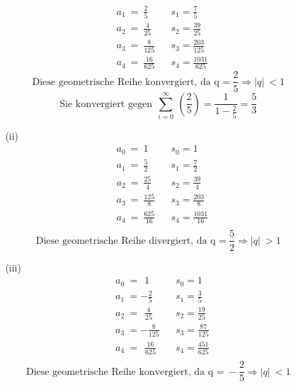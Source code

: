 \documentclass [a4paper,12pt]{article}
\begin{document}
\begin{enumerate}
\begin{enumerate}
\begin{enumerate}
\begin{align*}
                                &a_1 \ = \ \frac{2}{5} 		&&	s_1 = \frac{7}{5}\\[0,15cm]
                                &a_2 \ = \ \frac{4}{25} 	&&	s_2 = \frac{39}{25}\\[0,15cm]
                                &a_3 \ = \ \frac{8}{125} 	&&	s_3 = \frac{203}{125}\\[0,15cm]
                                &a_4 \ = \ \frac{16}{625}	&&	s_4 = \frac{1031}{625} 
                            \end{align*}
				            $$\text{Diese geometrische Reihe konvergiert, da q =} \ \frac{2}{5} \Rightarrow |q| \ < 1$$
				            \[\text{Sie konvergiert gegen} \ \  \sum_{i=0}^\infty~\left(\frac{2}{5}\right) = \frac{1}{1-\frac{2}{5}} = \frac{5}{3} \]
                        \item[(ii)]
                            \begin{align*}
                				&a_0 \ = \ 1				&&	s_0 = 1\\[0,15cm]
                				&a_1 \ = \ \frac{5}{2}		&&	s_1 = \frac{7}{2}\\[0,15cm]
                				&a_2 \ = \ \frac{25}{4}		&&	s_2 = \frac{39}{4}\\[0,15cm]
                				&a_3 \ = \ \frac{125}{8}	&&	s_3 = \frac{203}{8}\\[0,15cm]
                				&a_4 \ = \ \frac{625}{16}	&&	s_4 = \frac{1031}{16} \\[0,15cm]
                            \end{align*}
				            $$\text{Diese geometrische Reihe divergiert, da q =} \ \frac{5}{2} \Rightarrow |q| \ > 1$$
                        \item[(iii)]
                            \begin{align*}
        		                &a_0 \ = \ \  1			&&      s_0 = 1\\[0,15cm]
        		                &a_1 \ =  -\frac{2}{5}		&&	s_1 = \frac{3}{5}\\[0,15cm]
        		                &a_2 \ = \ \  \frac{4}{25} 	&&     	s_2 = \frac{19}{25}\\[0,15cm]
        		                &a_3 \ =  -\frac{8}{125}	&&      s_3 = \frac{87}{125}\\[0,15cm]
        		                &a_4 \ = \ \  \frac{16}{625}	&&      s_4 = \frac{451}{625} \\
                            \end{align*}
            				$$\text{Diese geometrische Reihe konvergiert, da q =} \ -\frac{2}{5} \Rightarrow |q| \ < 1 $$ 

\end{enumerate}
\end{enumerate}
\end{enumerate}
\end{document}
